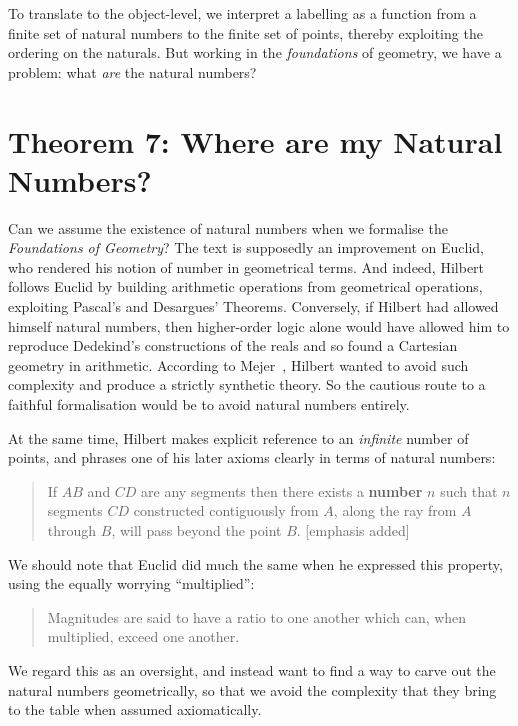 To translate to the object-level, we interpret a labelling as a function from a finite set of natural numbers to the finite set of points, thereby exploiting the ordering on the naturals. But working in the \emph{foundations} of geometry, we have a problem: what \emph{are} the natural numbers?

\section{Theorem 7: Where are my Natural Numbers?}
Can we assume the existence of natural numbers when we formalise the \emph{Foundations of Geometry}? The text is supposedly an improvement on Euclid, who rendered his notion of number in geometrical terms. And indeed, Hilbert follows Euclid by building arithmetic operations from geometrical operations, exploiting Pascal's and Desargues' Theorems. Conversely, if Hilbert had allowed himself natural numbers, then higher-order logic alone would have allowed him to reproduce Dedekind's constructions of the reals and so found a Cartesian geometry in arithmetic. According to Mejer~\cite{MajerHilbertKleinComplexity}, Hilbert wanted to avoid such complexity and produce a strictly synthetic theory. So the cautious route to a faithful formalisation would be to avoid natural numbers entirely.

At the same time, Hilbert makes explicit reference to an \emph{infinite} number of points, and phrases one of his later axioms clearly in terms of natural numbers:

\begin{quote}
  If $AB$ and $CD$ are any segments then there exists a \textbf{number} $n$ such that $n$ segments $CD$ constructed contiguously from $A$, along the ray from $A$ through $B$, will pass beyond the point $B$.
[emphasis added]\end{quote}

We should note that Euclid did much the same when he expressed this property, using the equally worrying ``multiplied'':

\begin{quote}
  Magnitudes are said to have a ratio to one another which can, when multiplied, exceed one another.\cite{Aleph0Elements}
\end{quote}

We regard this as an oversight, and instead want to find a way to carve out the natural numbers geometrically, so that we avoid the complexity that they bring to the table when assumed axiomatically.

